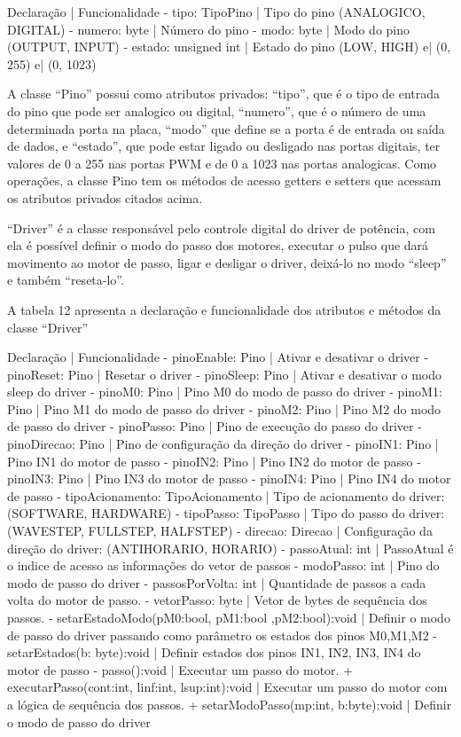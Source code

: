 Declaração | Funcionalidade
- tipo: TipoPino | Tipo do pino (ANALOGICO, DIGITAL)
- numero: byte | Número do pino
- modo: byte | Modo do pino (OUTPUT, INPUT)
- estado: unsigned int | Estado do pino (LOW, HIGH) e| (0, 255) e| (0, 1023)

A classe “Pino” possui como atributos privados: “tipo”, que é o tipo de entrada do pino que pode ser analogico 
ou digital, “numero”, que é o número de uma determinada porta na placa, “modo” que define se a porta é de entrada 
ou saída de dados, e “estado”, que pode estar ligado ou desligado nas portas digitais, ter valores de 0 a 255 nas 
portas PWM e de 0 a 1023 nas portas analogicas. Como operações, a classe Pino tem os métodos de acesso getters e 
setters que acessam os atributos privados citados acima.

“Driver” é a classe responsável pelo controle digital do driver de potência, com ela é possível definir o modo 
do passo dos motores, executar o pulso que dará movimento ao motor de passo, ligar e desligar o driver, deixá-lo 
no modo “sleep” e também “reseta-lo”.

A tabela 12 apresenta a declaração e funcionalidade dos atributos e métodos da classe “Driver”



Declaração | Funcionalidade
- pinoEnable: Pino | Ativar e desativar o driver
- pinoReset: Pino | Resetar o driver
- pinoSleep: Pino | Ativar e desativar o modo sleep do driver
- pinoM0: Pino | Pino M0 do modo de passo do driver
- pinoM1: Pino | Pino M1 do modo de passo do driver
- pinoM2: Pino | Pino M2 do modo de passo do driver
- pinoPasso: Pino | Pino de execução do passo do driver
- pinoDirecao: Pino | Pino de configuração da direção do driver
- pinoIN1: Pino | Pino IN1 do motor de passo
- pinoIN2: Pino | Pino IN2 do motor de passo
- pinoIN3: Pino | Pino IN3 do motor de passo
- pinoIN4: Pino | Pino IN4 do motor de passo
- tipoAcionamento: TipoAcionamento | Tipo de acionamento do driver: (SOFTWARE, HARDWARE)
- tipoPasso: TipoPasso | Tipo do passo do driver: (WAVESTEP, FULLSTEP, HALFSTEP)
- direcao: Direcao | Configuração da direção do driver: (ANTIHORARIO, HORARIO)
- passoAtual: int | PassoAtual é o indice de acesso as informações do vetor de passos
- modoPasso: int | Pino do modo de passo do driver
- passosPorVolta: int | Quantidade de passos a cada volta do motor de passo.
- vetorPasso: byte | Vetor de bytes de sequência dos passos.
- setarEstadoModo(pM0:bool, pM1:bool ,pM2:bool):void | Definir o modo de passo do driver passando como parâmetro os estados dos pinos M0,M1,M2
- setarEstados(b: byte):void | Definir estados dos pinos IN1, IN2, IN3, IN4 do motor de passo
- passo():void | Executar um passo do motor.
+ executarPasso(cont:int, linf:int, lsup:int):void | Executar um passo do motor com a lógica de sequência dos passos.
+ setarModoPasso(mp:int, b:byte):void | Definir o modo de passo do driver

